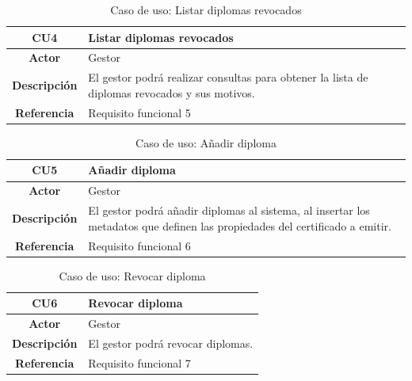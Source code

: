 \begin{table}[!h]
	\begin{center}
		\begin{tabular}{|c|p{10cm}|}
		\hline \textbf{CU4} & Listar diplomas revocados \\ 
		\hline \textbf{Actor} & Gestor\\ 
		\hline \textbf{Descripción} & El gestor podrá realizar consultas para obtener la lista de diplomas revocados y sus motivos. \\ 
		\hline \textbf{Referencia} & Requisito funcional 5 \\ 
		\hline 
		\end{tabular}
		\caption{Caso de uso: Listar diplomas revocados}
		\label{tab:CU4}
	\end{center}
\end{table}

\begin{table}[!h]
	\begin{center}
		\begin{tabular}{|c|p{10cm}|}
		\hline \textbf{CU5} & Añadir diploma \\ 
		\hline \textbf{Actor} & Gestor\\ 
		\hline \textbf{Descripción} & El gestor podrá añadir diplomas al sistema, al insertar los metadatos que definen las propiedades del certificado a emitir. \\ 
		\hline \textbf{Referencia} & Requisito funcional 6 \\ 
		\hline 
		\end{tabular}
		\caption{Caso de uso: Añadir diploma}
		\label{tab:CU5}
	\end{center}
\end{table}

\begin{table}[!h]
	\begin{center}
		\begin{tabular}{|c|p{10cm}|}
		\hline \textbf{CU6} & Revocar diploma \\ 
		\hline \textbf{Actor} & Gestor\\ 
		\hline \textbf{Descripción} & El gestor podrá revocar diplomas.\\ 
		\hline \textbf{Referencia} & Requisito funcional 7\\ 
		\hline 
		\end{tabular}
		\caption{Caso de uso: Revocar diploma}
		\label{tab:CU6}
	\end{center}
\end{table}

